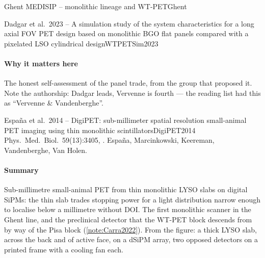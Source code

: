 \begin{programnote}{Ghent MEDISIP -- monolithic lineage and WT-PET}{Ghent}
\begin{papernote}{Dadgar et al.\ 2023 -- A simulation study of the system characteristics for a long axial FOV PET design based on monolithic BGO flat panels compared with a pixelated LSO cylindrical design}{WTPETSim2023}
\paragraph{Why it matters here}
The honest self-assessment of the panel trade, from the group that proposed
it. Note the authorship: Dadgar leads, Vervenne is fourth --- the reading
list had this as ``Vervenne \& Vandenberghe''.

\end{papernote}

\begin{papernote}{Espa\~na et al.\ 2014 -- DigiPET: sub-millimeter spatial resolution small-animal PET imaging using thin monolithic scintillators}{DigiPET2014}
Phys.\ Med.\ Biol.\ 59(13):3405, . Espa\~na,
Marcinkowski, Keereman, Vandenberghe, Van Holen.

\paragraph{Summary}
Sub-millimetre small-animal PET from thin monolithic LYSO slabs on digital
SiPMs: the thin slab trades stopping power for a light distribution narrow
enough to localise below a millimetre without DOI. The first monolithic
scanner in the Ghent line, and the preclinical detector that the WT-PET block
descends from by way of the Pisa block (\ref{note:Carra2022}).
 From the
figure: a  thick LYSO slab,  across the back and 
of active face, on a dSiPM array, two opposed detectors on a printed frame
with a cooling fan each.

\end{papernote}
 
\end{programnote}
 
 
 
